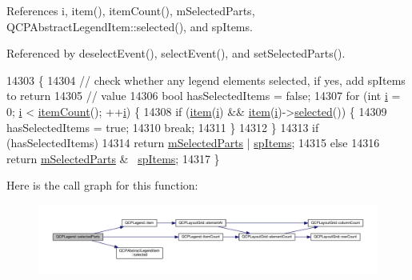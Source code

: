 References i, item(), item\+Count(), m\+Selected\+Parts, Q\+C\+P\+Abstract\+Legend\+Item\+::selected(), and sp\+Items.



Referenced by deselect\+Event(), select\+Event(), and set\+Selected\+Parts().


\begin{DoxyCode}
14303                                                         \{
14304   \textcolor{comment}{// check whether any legend elements selected, if yes, add spItems to return}
14305   \textcolor{comment}{// value}
14306   \textcolor{keywordtype}{bool} hasSelectedItems = \textcolor{keyword}{false};
14307   \textcolor{keywordflow}{for} (\textcolor{keywordtype}{int} \hyperlink{_comparision_pictures_2_createtest_image_8m_a6f6ccfcf58b31cb6412107d9d5281426}{i} = 0; \hyperlink{_comparision_pictures_2_createtest_image_8m_a6f6ccfcf58b31cb6412107d9d5281426}{i} < \hyperlink{class_q_c_p_legend_a198228e9cdc78d3a3c306fa6763d0404}{itemCount}(); ++\hyperlink{_comparision_pictures_2_createtest_image_8m_a6f6ccfcf58b31cb6412107d9d5281426}{i}) \{
14308     \textcolor{keywordflow}{if} (\hyperlink{class_q_c_p_legend_a454272d7094437beb3278a2294006da5}{item}(\hyperlink{_comparision_pictures_2_createtest_image_8m_a6f6ccfcf58b31cb6412107d9d5281426}{i}) && \hyperlink{class_q_c_p_legend_a454272d7094437beb3278a2294006da5}{item}(\hyperlink{_comparision_pictures_2_createtest_image_8m_a6f6ccfcf58b31cb6412107d9d5281426}{i})->\hyperlink{class_q_c_p_abstract_legend_item_ac776e68e3367704452131c6aa9908bb9}{selected}()) \{
14309       hasSelectedItems = \textcolor{keyword}{true};
14310       \textcolor{keywordflow}{break};
14311     \}
14312   \}
14313   \textcolor{keywordflow}{if} (hasSelectedItems)
14314     \textcolor{keywordflow}{return} \hyperlink{class_q_c_p_legend_a917a34dd2856baafd8d56852d94d00e2}{mSelectedParts} | \hyperlink{class_q_c_p_legend_a5404de8bc1e4a994ca4ae69e2c7072f1a768bfb95f323db4c66473375032c0af7}{spItems};
14315   \textcolor{keywordflow}{else}
14316     \textcolor{keywordflow}{return} \hyperlink{class_q_c_p_legend_a917a34dd2856baafd8d56852d94d00e2}{mSelectedParts} & ~\hyperlink{class_q_c_p_legend_a5404de8bc1e4a994ca4ae69e2c7072f1a768bfb95f323db4c66473375032c0af7}{spItems};
14317 \}
\end{DoxyCode}


Here is the call graph for this function\+:\nopagebreak
\begin{figure}[H]
\begin{center}
\leavevmode
\includegraphics[width=350pt]{class_q_c_p_legend_abbbf1b2d6a149013527ed87b0780894a_cgraph}
\end{center}
\end{figure}




